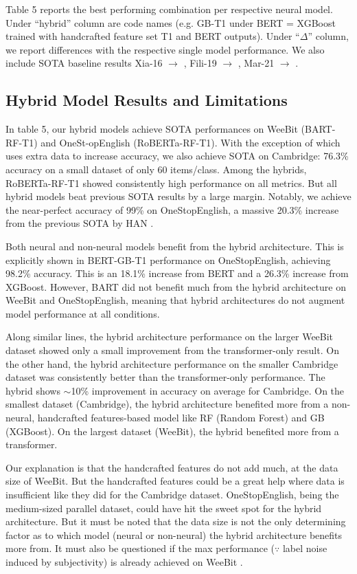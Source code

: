 \documentclass[11pt]{article}
\begin{document}
Table 5 reports the best performing combination per respective neural model. Under ``hybrid'' column are code names (e.g. GB-T1 under BERT = XGBoost trained with handcrafted feature set T1 and BERT outputs). Under ``$\Delta$'' column, we report differences with the respective single model performance. We also include SOTA baseline results Xia-16 $\rightarrow$ \citet{Xia:16}, Fili-19 $\rightarrow$ \citet{Fili:19}, Mar-21 $\rightarrow$ \citet{Martinc:21}.

\subsection{Hybrid Model Results and Limitations}
In table 5, our hybrid models achieve SOTA performances on WeeBit (BART-RF-T1) and OneSt-opEnglish (RoBERTa-RF-T1). With the exception of \citet{Xia:16} which uses extra data to increase accuracy, we also achieve SOTA on Cambridge: 76.3\% accuracy on a small dataset of only 60 items/class. Among the hybrids, RoBERTa-RF-T1 showed consistently high performance on all metrics. But all hybrid models beat previous SOTA results by a large margin. Notably, we achieve the near-perfect accuracy of 99\% on OneStopEnglish, a massive 20.3\% increase from the previous SOTA \citep{Martinc:21} by HAN \citep{10.1007/978-3-030-45439-5_3}.

Both neural and non-neural models benefit from the hybrid architecture. This is explicitly shown in BERT-GB-T1 performance on OneStopEnglish, achieving 98.2\% accuracy. This is an 18.1\% increase from BERT and a 26.3\% increase from XGBoost. However, BART did not benefit much from the hybrid architecture on WeeBit and OneStopEnglish, meaning that hybrid architectures do not augment model performance at all conditions. 

Along similar lines, the hybrid architecture performance on the larger WeeBit dataset showed only a small improvement from the transformer-only result. On the other hand, the hybrid architecture performance on the smaller Cambridge dataset was consistently better than the transformer-only performance. The hybrid shows $\sim$10\% improvement in accuracy on average for Cambridge. On the smallest dataset (Cambridge), the hybrid architecture benefited more from a non-neural, handcrafted features-based model like RF (Random Forest) and GB (XGBoost). On the largest dataset (WeeBit), the hybrid benefited more from a transformer. 

Our explanation is that the handcrafted features do not add much, at the data size of WeeBit. But the handcrafted features could be a great help where data is insufficient like they did for the Cambridge dataset. OneStopEnglish, being the medium-sized parallel dataset, could have hit the sweet spot for the hybrid architecture. But it must be noted that the data size is not the only determining factor as to which model (neural or non-neural) the hybrid architecture benefits more from. It must also be questioned if the max performance ($\because$ label noise induced by subjectivity) \citep{frenay2014comprehensive} is already achieved on WeeBit \citep{deutsch-etal-2020-linguistic}. 
\end{document}

